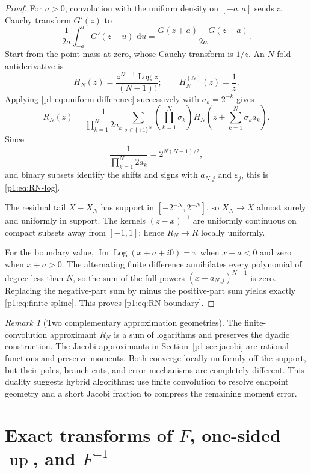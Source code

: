 \documentclass[11pt]{article}
\theoremstyle{definition}
\theoremstyle{remark}
\newtheorem{remark}[theorem]{Remark}
\newcommand{\dd}{\,\mathrm d}
\newcommand{\Up}{\operatorname{up}}
\newcommand{\eps}{\varepsilon}
\newcommand{\Log}{\operatorname{Log}}
\begin{document}
\begin{proof}
For \(a>0\), convolution with the uniform density on \([-a,a]\) sends a Cauchy transform
\(G'(z)\) to
\begin{equation}
 \frac1{2a}\int_{-a}^{a}G'(z-u)\,\dd u
 =\frac{G(z+a)-G(z-a)}{2a}.                                  \label{p1:eq:uniform-difference}
\end{equation}
Start from the point mass at zero, whose Cauchy transform is \(1/z\).  An \(N\)-fold
antiderivative is
\[
 H_N(z)=\frac{z^{N-1}\Log z}{(N-1)!};
 \qquad H_N^{(N)}(z)=\frac1z.
\]
Applying \eqref{p1:eq:uniform-difference} successively with \(a_k=2^{-k}\) gives
\[
 R_N(z)=\frac{1}{\prod_{k=1}^{N}2a_k}
 \sum_{\sigma\in\{\pm1\}^N}
 \left(\prod_{k=1}^{N}\sigma_k\right)
 H_N\!\left(z+\sum_{k=1}^{N}\sigma_k a_k\right).
\]
Since
\[
 \frac1{\prod_{k=1}^{N}2a_k}=2^{N(N-1)/2},
\]
and binary subsets identify the shifts and signs with \(a_{N,j}\) and \(\eps_j\), this is
\eqref{p1:eq:RN-log}.

The residual tail \(X-X_N\) has support in \([-2^{-N},2^{-N}]\), so \(X_N\to X\)
almost surely and uniformly in support.  The kernels \((z-x)^{-1}\) are uniformly
continuous on compact subsets away from \([-1,1]\); hence \(R_N\to R\) locally uniformly.

For the boundary value, \(\operatorname{Im}\Log(x+a+i0)=\pi\) when \(x+a<0\) and zero
when \(x+a>0\).  The alternating finite difference annihilates every polynomial of degree
less than \(N\), so the sum of the full powers \((x+a_{N,j})^{N-1}\) is zero.  Replacing the
negative-part sum by minus the positive-part sum yields exactly
\eqref{p1:eq:finite-spline}.  This proves \eqref{p1:eq:RN-boundary}.
\end{proof}

\begin{remark}[Two complementary approximation geometries]
The finite-convolution approximant \(R_N\) is a sum of logarithms and preserves the dyadic
construction.  The Jacobi approximants in Section~\ref{p1:sec:jacobi} are rational functions
and preserve moments.  Both converge locally uniformly off the support, but their poles,
branch cuts, and error mechanisms are completely different.  This duality suggests hybrid
algorithms: use finite convolution to resolve endpoint geometry and a short Jacobi fraction
to compress the remaining moment error.
\end{remark}

\section{Exact transforms of \(F\), one-sided \(\Up\), and \(F^{-1}\)}\label{p1:sec:fabius-transforms}
\end{document}
